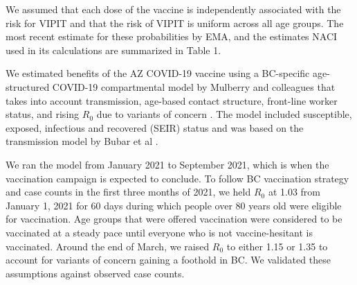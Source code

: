 \documentclass[]{interact}
\theoremstyle{plain}%
\theoremstyle{definition}
\theoremstyle{remark}
\begin{document}
We assumed that each dose of the vaccine is independently associated
with the risk for VIPIT and that the risk of VIPIT is uniform across all
age groups. The most recent estimate for these probabilities by EMA, and
the estimates NACI used in its calculations are summarized in Table 1.

We estimated benefits of the AZ COVID-19 vaccine using a BC-specific
age-structured COVID-19 compartmental model by Mulberry and colleagues
that takes into account transmission, age-based contact structure,
front-line worker status, and rising \(R_0\) due to variants of concern
\citep{mulberry_vaccine_2021}. The model included susceptible, exposed,
infectious and recovered (SEIR) status and was based on the transmission
model by Bubar et al \citep{bubar_model-informed_2021}.

We ran the model from January 2021 to September 2021, which is when the
vaccination campaign is expected to conclude. To follow BC vaccination
strategy and case counts in the first three months of 2021, we held
\(R_0\) at 1.03 from January 1, 2021 for 60 days during which people
over 80 years old were eligible for vaccination. Age groups that were
offered vaccination were considered to be vaccinated at a steady pace
until everyone who is not vaccine-hesitant is vaccinated. Around the end
of March, we raised \(R_0\) to either 1.15 or 1.35 to account for
variants of concern gaining a foothold in BC. We validated these
assumptions against observed case counts.
\end{document}
